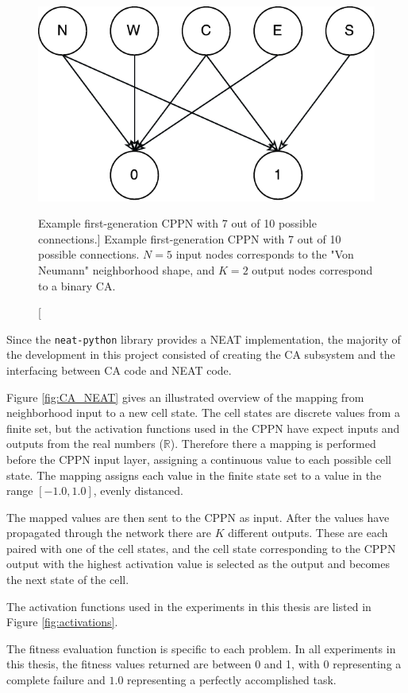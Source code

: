 \begin{figure}
\centering
\includegraphics[width=.5\columnwidth]{fig/single_layer_cppn}
\caption
[Example first-generation CPPN with 7 out of 10 possible connections.]
{Example first-generation CPPN with 7 out of 10 possible connections. $N=5$ input nodes corresponds to the "Von Neumann" neighborhood shape, and $K=2$ output nodes correspond to a binary CA.}
\label{fig:single_layer_cppn}
\end{figure}

Since the \texttt{neat-python} library provides a NEAT implementation,
the majority of the development in this project consisted of creating the CA subsystem and the interfacing between CA code and NEAT code.

Figure \ref{fig:CA_NEAT} gives an illustrated overview of the mapping from neighborhood input to a new cell state.
The cell states are discrete values from a finite set,
but the activation functions used in the CPPN have expect inputs and outputs from the real numbers ($\mathbb{R}$).
Therefore there a mapping is performed before the CPPN input layer, assigning a continuous value to each possible cell state.
The mapping assigns each value in the finite state set to a value in the range $[-1.0, 1.0]$, evenly distanced.

The mapped values are then sent to the CPPN as input.
After the values have propagated through the network there are $K$ different outputs.
These are each paired with one of the cell states,
and the cell state corresponding to the CPPN output with the highest activation value is selected as the output and becomes the next state of the cell.

The activation functions used in the experiments in this thesis are listed in Figure \ref{fig:activations}.

The fitness evaluation function is specific to each problem.
In all experiments in this thesis, the fitness values returned are between 0 and 1, with 0 representing a complete failure and $1.0$ representing a perfectly accomplished task.

